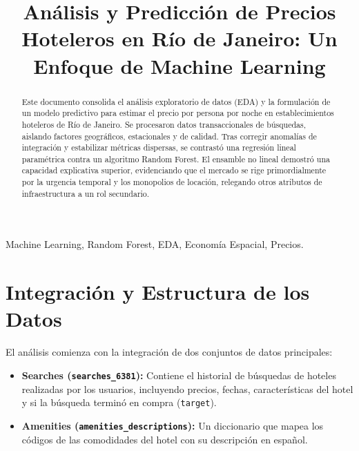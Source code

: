 \documentclass[conference]{IEEEtran}
\begin{document}
\title{Análisis y Predicción de Precios Hoteleros en Río de Janeiro: Un Enfoque de Machine Learning}

\author{
\and
{}
}

\maketitle

\begin{abstract}
Este documento consolida el análisis exploratorio de datos (EDA) y la formulación de un modelo predictivo para estimar el precio por persona por noche en establecimientos hoteleros de Río de Janeiro. Se procesaron datos transaccionales de búsquedas, aislando factores geográficos, estacionales y de calidad. Tras corregir anomalías de integración y estabilizar métricas dispersas, se contrastó una regresión lineal paramétrica contra un algoritmo Random Forest. El ensamble no lineal demostró una capacidad explicativa superior, evidenciando que el mercado se rige primordialmente por la urgencia temporal y los monopolios de locación, relegando otros atributos de infraestructura a un rol secundario.
\end{abstract}

\begin{IEEEkeywords}
Machine Learning, Random Forest, EDA, Economía Espacial, Precios.
\end{IEEEkeywords}

\section{Integración y Estructura de los Datos}
El análisis comienza con la integración de dos conjuntos de datos principales:
\begin{itemize}
    \item \textbf{Searches (\texttt{searches\_6381}):} Contiene el historial de búsquedas de hoteles realizadas por los usuarios, incluyendo precios, fechas, características del hotel y si la búsqueda terminó en compra (\texttt{target}).
    \item \textbf{Amenities (\texttt{amenities\_descriptions}):} Un diccionario que mapea los códigos de las comodidades del hotel con su descripción en español.
\end{itemize}
\end{document}

